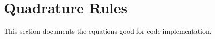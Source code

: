 \documentclass [10pt,letterpaper]{article}
\newcommand{\unitvectorsym}[1]{\hat{\vectorsym{#1}}}
\begin{document}




\section{Quadrature Rules}
\label{sec:quadrature-rules}
This section documents the equations good for code implementation.
\end{document}
